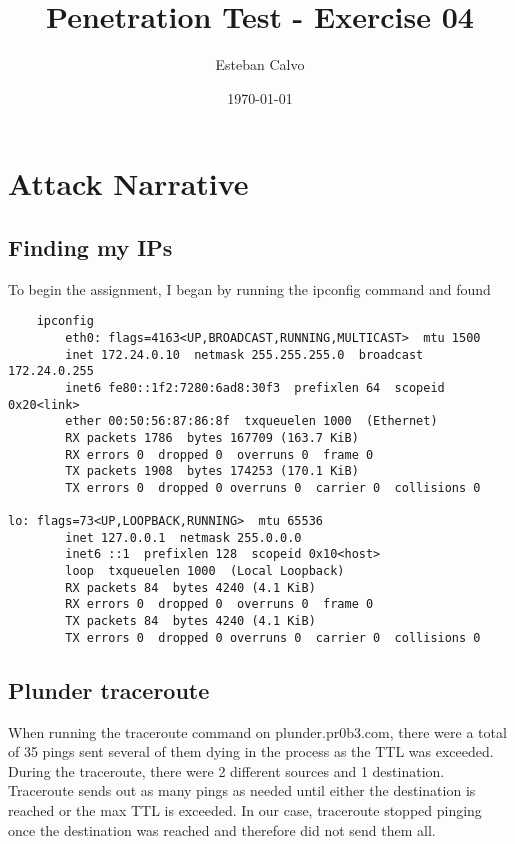 \documentclass[notitlepage]{article}
\begin{document}
  
\title{Penetration Test - Exercise 04}
\author{Esteban Calvo}
\date{\isodate\today}

\maketitle

\tableofcontents

\newpage


\section{Attack Narrative}
    \subsection{Finding my IPs}
    To begin the assignment, I began by running the ipconfig command and found
    \begin{verbatim}
    ipconfig
        eth0: flags=4163<UP,BROADCAST,RUNNING,MULTICAST>  mtu 1500
        inet 172.24.0.10  netmask 255.255.255.0  broadcast 172.24.0.255
        inet6 fe80::1f2:7280:6ad8:30f3  prefixlen 64  scopeid 0x20<link>
        ether 00:50:56:87:86:8f  txqueuelen 1000  (Ethernet)
        RX packets 1786  bytes 167709 (163.7 KiB)
        RX errors 0  dropped 0  overruns 0  frame 0
        TX packets 1908  bytes 174253 (170.1 KiB)
        TX errors 0  dropped 0 overruns 0  carrier 0  collisions 0

lo: flags=73<UP,LOOPBACK,RUNNING>  mtu 65536
        inet 127.0.0.1  netmask 255.0.0.0
        inet6 ::1  prefixlen 128  scopeid 0x10<host>
        loop  txqueuelen 1000  (Local Loopback)
        RX packets 84  bytes 4240 (4.1 KiB)
        RX errors 0  dropped 0  overruns 0  frame 0
        TX packets 84  bytes 4240 (4.1 KiB)
        TX errors 0  dropped 0 overruns 0  carrier 0  collisions 0
    \end{verbatim}

    \subsection{Plunder traceroute}
    When running the traceroute command on plunder.pr0b3.com, there were a total of 35 pings sent several of them dying in the process as the TTL was exceeded. During the traceroute, 
    there were 2 different sources and 1 destination. Traceroute sends out as many pings as needed until either the destination is reached or the max TTL is exceeded. In our case,
    traceroute stopped pinging once the destination was reached and therefore did not send them all. 
\end{document}
